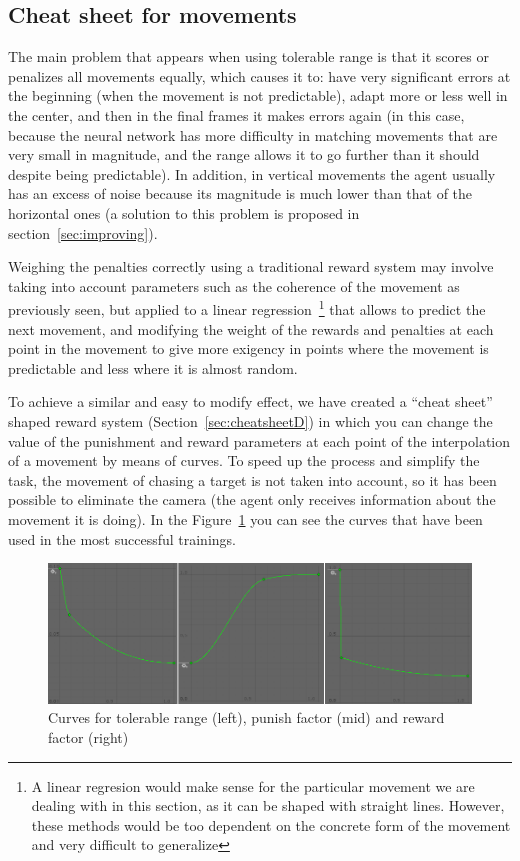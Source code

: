 \subsection{Cheat sheet for movements} %

The main problem that appears when using tolerable range is that it scores or penalizes all movements equally, which causes it to: have very significant errors at the beginning (when the movement is not predictable), adapt more or less well in the center, and then in the final frames it makes errors again (in this case, because the neural network has more difficulty in matching movements that are very small in magnitude, and the range allows it to go further than it should despite being predictable). In addition, in vertical movements the agent usually has an excess of noise because its magnitude is much lower than that of the horizontal ones (a solution to this problem is proposed in section~\ref{sec:improving}).

Weighing the penalties correctly using a traditional reward system may involve taking into account parameters such as the coherence of the movement as  previously seen, but applied to a linear regression~\footnote{A linear regresion would make sense for the particular movement we are dealing with in this section, as it can be shaped with straight lines. However, these methods would be too dependent on the concrete form of the movement and very difficult to generalize} that allows to predict the next movement, and modifying the weight of the rewards and penalties at each point in the movement to give more exigency in points where the movement is predictable and less where it is almost random.

To achieve a similar and easy to modify effect, we have created a ``cheat sheet'' shaped reward system (Section~\ref{sec:cheatsheetD}) in which you can change the value of the punishment and reward parameters at each point of the interpolation of a movement by means of curves. To speed up the process and simplify the task, the movement of chasing a target is not taken into account, so it has been possible to eliminate the camera (the agent only receives information about the movement it is doing). In the Figure~\ref{fig:axisCS} you can see the curves that have been used in the most successful trainings.

\begin{figure}[h]
  \centering
		\includegraphics[width=1\textwidth]{img/axisCS.png}
  \caption{Curves for tolerable range (left), punish factor (mid) and reward factor (right)}
  \label{fig:axisCS}
\end{figure}

